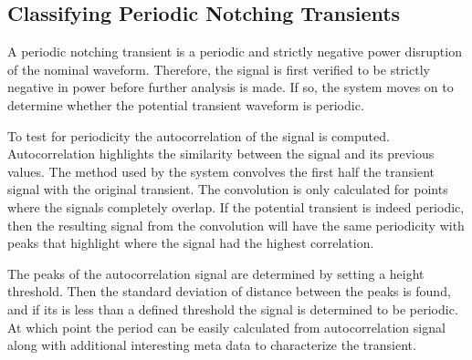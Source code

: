 \documentclass[10pt,conference,compsocconf]{IEEEtran}
\begin{document}
\subsection{Classifying Periodic Notching Transients}

A periodic notching transient is a periodic and strictly negative power disruption of the nominal waveform. Therefore, the signal is first verified to be strictly negative in power before further analysis is made. If so, the system moves on to determine whether the potential transient waveform is periodic. 

To test for periodicity the autocorrelation of the signal is computed. Autocorrelation highlights the similarity between the signal and its previous values. The method used by the system convolves the first half the transient signal with the original transient. The convolution is only calculated for points where the signals completely overlap. If the potential transient is indeed periodic, then the resulting signal from the convolution will have the same periodicity with peaks that highlight where the signal had the highest correlation. 

The peaks of the autocorrelation signal are determined by setting a height threshold. Then the standard deviation of distance between the peaks is found, and if its is less than a defined threshold the signal is determined to be periodic. At which point the period can be easily calculated from autocorrelation signal along with additional interesting meta data to characterize the transient. 

%
%
\end{document}

